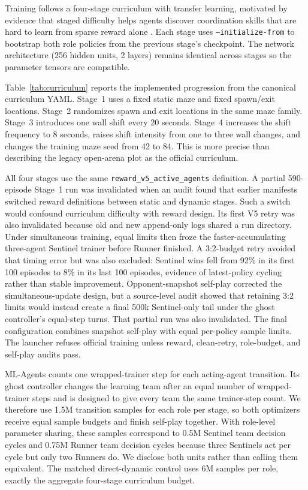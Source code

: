 \documentclass[journal]{IEEEtran}
\begin{document}
Training follows a four-stage curriculum with transfer learning, motivated by evidence that staged difficulty helps agents discover coordination skills that are hard to learn from sparse reward alone \cite{grupen2021,zhang2023curriculum}. Each stage uses \texttt{--initialize-from} to bootstrap both role policies from the previous stage's checkpoint. The network architecture (256 hidden units, 2 layers) remains identical across stages so the parameter tensors are compatible.

Table~\ref{tab:curriculum} reports the implemented progression from the canonical curriculum YAML. Stage~1 uses a fixed static maze and fixed spawn/exit locations. Stage~2 randomizes spawn and exit locations in the same maze family. Stage~3 introduces one wall shift every 20 seconds. Stage~4 increases the shift frequency to 8 seconds, raises shift intensity from one to three wall changes, and changes the training maze seed from 42 to 84. This is more precise than describing the legacy open-arena plot as the official curriculum.

All four stages use the same \texttt{reward\_v5\_active\_agents} definition. A partial 590-episode Stage~1 run was invalidated when an audit found that earlier manifests switched reward definitions between static and dynamic stages. Such a switch would confound curriculum difficulty with reward design. Its first V5 retry was also invalidated because old and new append-only logs shared a run directory. Under simultaneous training, equal limits then froze the faster-accumulating three-agent Sentinel trainer before Runner finished. A 3:2-budget retry avoided that timing error but was also excluded: Sentinel wins fell from 92\% in its first 100 episodes to 8\% in its last 100 episodes, evidence of latest-policy cycling rather than stable improvement. Opponent-snapshot self-play corrected the simultaneous-update design, but a source-level audit showed that retaining 3:2 limits would instead create a final 500k Sentinel-only tail under the ghost controller's equal-step turns. That partial run was also invalidated. The final configuration combines snapshot self-play with equal per-policy sample limits. The launcher refuses official training unless reward, clean-retry, role-budget, and self-play audits pass.

ML-Agents counts one wrapped-trainer step for each acting-agent transition. Its ghost controller changes the learning team after an equal number of wrapped-trainer steps and is designed to give every team the same trainer-step count. We therefore use 1.5M transition samples for each role per stage, so both optimizers receive equal sample budgets and finish self-play together. With role-level parameter sharing, these samples correspond to 0.5M Sentinel team decision cycles and 0.75M Runner team decision cycles because three Sentinels act per cycle but only two Runners do. We disclose both units rather than calling them equivalent. The matched direct-dynamic control uses 6M samples per role, exactly the aggregate four-stage curriculum budget.
\end{document}
